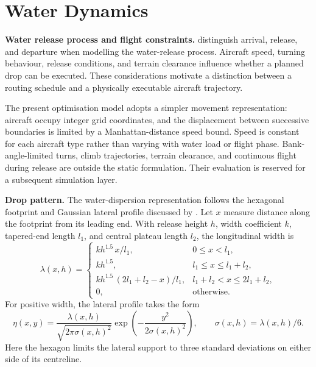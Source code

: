 \section{Water Dynamics}
\label{sec:lit-water-dynamics}

\textbf{Water release process and flight constraints.} \citet{liu2025hierarchical} distinguish arrival, release, and departure when modelling the water-release process. Aircraft speed, turning behaviour, release conditions, and terrain clearance influence whether a planned drop can be executed. These considerations motivate a distinction between a routing schedule and a physically executable aircraft trajectory.

The present optimisation model adopts a simpler movement representation: aircraft occupy integer grid coordinates, and the displacement between successive boundaries is limited by a Manhattan-distance speed bound. Speed is constant for each aircraft type rather than varying with water load or flight phase. Bank-angle-limited turns, climb trajectories, terrain clearance, and continuous flight during release are outside the static formulation. Their evaluation is reserved for a subsequent simulation layer.

\textbf{Drop pattern.} The water-dispersion representation follows the hexagonal footprint and Gaussian lateral profile discussed by \citet{liu2025hierarchical}. Let $x$ measure distance along the footprint from its leading end. With release height $h$, width coefficient $k$, tapered-end length $l_1$, and central plateau length $l_2$, the longitudinal width is
\begin{equation}
    \lambda(x,h) =
    \begin{cases}
        k h^{1.5}\,x/l_1, & 0 \leq x < l_1, \\[3pt]
        k h^{1.5}, & l_1 \leq x \leq l_1+l_2, \\[3pt]
        k h^{1.5}\,(2l_1+l_2-x)/l_1, & l_1+l_2 < x \leq 2l_1+l_2, \\[3pt]
        0, & \text{otherwise}.
    \end{cases}
\end{equation}
For positive width, the lateral profile takes the form
\begin{equation}
    \eta(x,y) = \frac{\lambda(x,h)}{\sqrt{2\pi\sigma(x,h)^2}}
    \exp\!\left(-\frac{y^2}{2\sigma(x,h)^2}\right),
    \qquad \sigma(x,h)=\lambda(x,h)/6.
\end{equation}
Here the hexagon limits the lateral support to three standard deviations on either side of its centreline.

